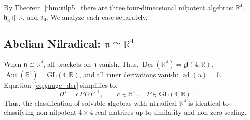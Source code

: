 \documentclass[11pt,a4paper]{article}
\theoremstyle{definition}
\theoremstyle{remark}
\newcommand{\R}{\mathbb{R}}
\newcommand{\n}{\mathfrak{n}}
\newcommand{\hh}{\mathfrak{h}}
\newcommand{\ad}{\operatorname{ad}}
\newcommand{\Aut}{\operatorname{Aut}}
\newcommand{\Der}{\operatorname{Der}}
\begin{document}
By Theorem~\ref{thm:nilp5}, there are three four-dimensional nilpotent algebras: $\R^4$, $\hh_3 \oplus \R$, and $\mathfrak{n}_4$. We analyze each case separately.

\subsection{Abelian Nilradical: $\n \cong \R^4$}\label{subsec:R4}
When $\n \cong \R^4$, all brackets on $\n$ vanish. Thus, $\Der(\R^4) = \mathfrak{gl}(4, \R)$, $\Aut(\R^4) = \mathrm{GL}(4, \R)$, and all inner derivations vanish: $\ad(u) = 0$. Equation~\eqref{eq:gauge_der} simplifies to:
\begin{equation}
    D' = c \, P D P^{-1}, \qquad c \in \R^\times, \quad P \in \mathrm{GL}(4, \R).
\end{equation}
Thus, the classification of solvable algebras with nilradical $\R^4$ is identical to classifying non-nilpotent $4 \times 4$ real matrices up to similarity and non-zero scaling.
\end{document}
